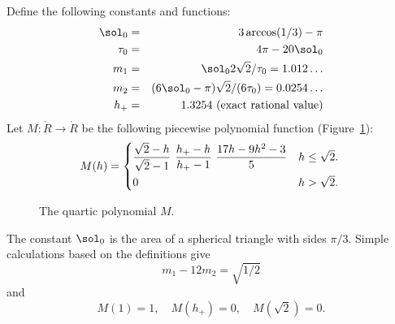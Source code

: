 

\begin{definition} 
%
%
%
%
%
%
Define the following constants and functions: 
\begin{eqnarray}\label{eqn:m-def} 
\sol_0 &=& 3\arccos(1/3)-\pi\\
\tau_0 &=& 4\pi  - 20\sol_0\\
m_1 &=& \sol_0 2\sqrt2/\tau_0 = 1.012\ldots \\ %
m_2  &=&  (6\sol_0- \pi)\sqrt2/(6 \tau_0) = 0.0254\ldots\\ %
h_+ &=& 1.3254 \hbox{~(exact rational value)}
\end{eqnarray}
Let $M:\ring{R}\to\ring{R}$ 
be the following piecewise polynomial function (Figure~\ref{fig:M}):
\begin{equation}\label{eqn:M} 
M(h) =
\begin{cases} 
\dfrac{\sqrt2-h}{\sqrt2-1}~ \dfrac{h_+-h}{h_+-1} ~\dfrac{17 h - 9 h^2 - 3}{5} 
& h \le \sqrt2.\vspace{3pt} \\
0 & h >\sqrt2.
\end{cases}
\\
\end{equation}
\end{definition}

\begin{figure}[htb]
\centering
{}
\caption{The quartic polynomial $M$.}
\label{fig:M}
\end{figure}

The constant $\sol_0$
is the area of a spherical triangle with sides $\pi/3$.
Simple calculations based on the definitions give
\begin{equation}\label{eqn:km}m_1 - 12m_2 = \sqrt{1/2}\end{equation} 
and
\begin{equation}M(1) = 1,\quad M(h_+)=0,\quad M(\sqrt2) =0.\end{equation} 

